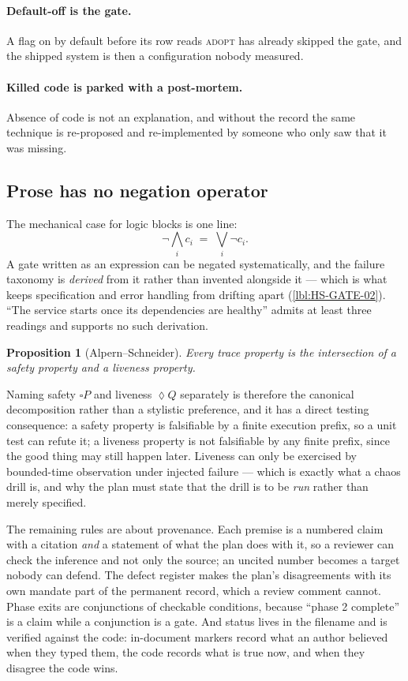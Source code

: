 \documentclass[11pt]{article}
\newtheorem{prop}{Proposition}[section]
\providecommand{\Box}{\square}
\providecommand{\Diamond}{\lozenge}
\begin{document}
\paragraph{Default-off is the gate.} A flag on by default before its row reads
\textsc{adopt} has already skipped the gate, and the shipped system is then a
configuration nobody measured.

\paragraph{Killed code is parked with a post-mortem.} Absence of code is not an
explanation, and without the record the same technique is re-proposed and
re-implemented by someone who only saw that it was missing.

\subsection{Prose has no negation operator}
\label{lbl:HS-EVID-04}

The mechanical case for logic blocks is one line:
\begin{equation}
\neg \bigwedge_i c_i \;=\; \bigvee_i \neg c_i .
\end{equation}
A gate written as an expression can be negated systematically, and the failure
taxonomy is \emph{derived} from it rather than invented alongside it --- which
is what keeps specification and error handling from drifting apart
(\ref{lbl:HS-GATE-02}). ``The service starts once its dependencies are
healthy'' admits at least three readings and supports no such derivation.

\begin{prop}[Alpern--Schneider]
Every trace property is the intersection of a safety property and a liveness
property.
\end{prop}

Naming safety $\Box P$ and liveness $\Diamond Q$ separately is therefore the
canonical decomposition rather than a stylistic preference, and it has a direct
testing consequence: a safety property is falsifiable by a finite execution
prefix, so a unit test can refute it; a liveness property is not falsifiable by
any finite prefix, since the good thing may still happen later. Liveness can
only be exercised by bounded-time observation under injected failure --- which
is exactly what a chaos drill is, and why the plan must state that the drill is
to be \emph{run} rather than merely specified.

The remaining rules are about provenance. Each premise is a numbered claim with
a citation \emph{and} a statement of what the plan does with it, so a reviewer
can check the inference and not only the source; an uncited number becomes a
target nobody can defend. The defect register makes the plan's disagreements
with its own mandate part of the permanent record, which a review comment
cannot. Phase exits are conjunctions of checkable conditions, because ``phase 2
complete'' is a claim while a conjunction is a gate. And status lives in the
filename and is verified against the code: in-document markers record what an
author believed when they typed them, the code records what is true now, and
when they disagree the code wins.
\end{document}
